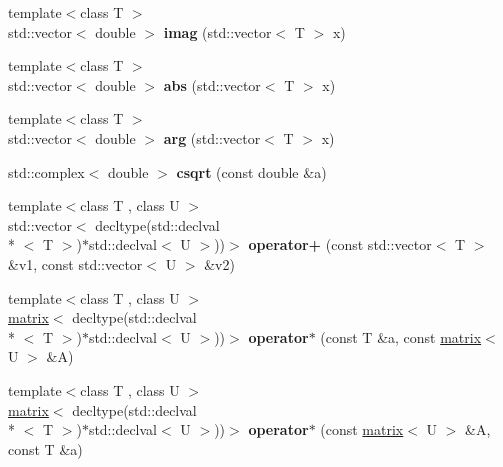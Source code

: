 \begin{DoxyCompactItemize}
\item 
\hypertarget{namespacekeycpp_a22cc33e0299a65158c81352603bcd35a}{{\footnotesize template$<$class T $>$ }\\std\-::vector$<$ double $>$ {\bfseries imag} (std\-::vector$<$ T $>$ x)}\label{namespacekeycpp_a22cc33e0299a65158c81352603bcd35a}

\item 
\hypertarget{namespacekeycpp_a01edbbe2645ae65b6ec2c08b2d4352e4}{{\footnotesize template$<$class T $>$ }\\std\-::vector$<$ double $>$ {\bfseries abs} (std\-::vector$<$ T $>$ x)}\label{namespacekeycpp_a01edbbe2645ae65b6ec2c08b2d4352e4}

\item 
\hypertarget{namespacekeycpp_a70d66686c6b209cc8eb64f84977544da}{{\footnotesize template$<$class T $>$ }\\std\-::vector$<$ double $>$ {\bfseries arg} (std\-::vector$<$ T $>$ x)}\label{namespacekeycpp_a70d66686c6b209cc8eb64f84977544da}

\item 
\hypertarget{namespacekeycpp_a952e5296774667c3be4e792b5cd980da}{std\-::complex$<$ double $>$ {\bfseries csqrt} (const double \&a)}\label{namespacekeycpp_a952e5296774667c3be4e792b5cd980da}

\item 
\hypertarget{namespacekeycpp_a4da6882977b2262f8d6f080b0eaf60c5}{{\footnotesize template$<$class T , class U $>$ }\\std\-::vector$<$ decltype(std\-::declval\\*
$<$ T $>$)$\ast$std\-::declval$<$ U $>$))$>$ {\bfseries operator+} (const std\-::vector$<$ T $>$ \&v1, const std\-::vector$<$ U $>$ \&v2)}\label{namespacekeycpp_a4da6882977b2262f8d6f080b0eaf60c5}

\item 
\hypertarget{namespacekeycpp_a8d5dbf37b71d16d686dd0fdbad82f8fb}{{\footnotesize template$<$class T , class U $>$ }\\\hyperlink{classkeycpp_1_1matrix}{matrix}$<$ decltype(std\-::declval\\*
$<$ T $>$)$\ast$std\-::declval$<$ U $>$))$>$ {\bfseries operator$\ast$} (const T \&a, const \hyperlink{classkeycpp_1_1matrix}{matrix}$<$ U $>$ \&A)}\label{namespacekeycpp_a8d5dbf37b71d16d686dd0fdbad82f8fb}

\item 
\hypertarget{namespacekeycpp_ae187563f8f86e256bc1394edcba1b2b1}{{\footnotesize template$<$class T , class U $>$ }\\\hyperlink{classkeycpp_1_1matrix}{matrix}$<$ decltype(std\-::declval\\*
$<$ T $>$)$\ast$std\-::declval$<$ U $>$))$>$ {\bfseries operator$\ast$} (const \hyperlink{classkeycpp_1_1matrix}{matrix}$<$ U $>$ \&A, const T \&a)}\label{namespacekeycpp_ae187563f8f86e256bc1394edcba1b2b1}


\end{DoxyCompactItemize}
